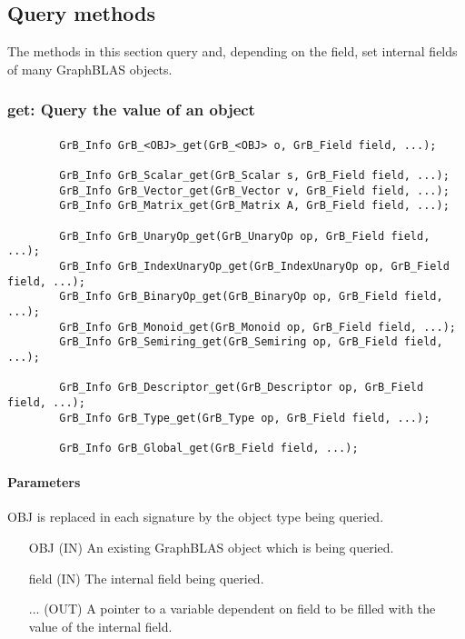 \subsection{Query methods}

The methods in this section query and, depending on the field, 
set internal fields of many GraphBLAS objects.

\subsubsection{{\sf get}: Query the value of an object}

\paragraph{\syntax}

\begin{verbatim}
        GrB_Info GrB_<OBJ>_get(GrB_<OBJ> o, GrB_Field field, ...);

        GrB_Info GrB_Scalar_get(GrB_Scalar s, GrB_Field field, ...);
        GrB_Info GrB_Vector_get(GrB_Vector v, GrB_Field field, ...);
        GrB_Info GrB_Matrix_get(GrB_Matrix A, GrB_Field field, ...);

        GrB_Info GrB_UnaryOp_get(GrB_UnaryOp op, GrB_Field field, ...);
        GrB_Info GrB_IndexUnaryOp_get(GrB_IndexUnaryOp op, GrB_Field field, ...);
        GrB_Info GrB_BinaryOp_get(GrB_BinaryOp op, GrB_Field field, ...);
        GrB_Info GrB_Monoid_get(GrB_Monoid op, GrB_Field field, ...);
        GrB_Info GrB_Semiring_get(GrB_Semiring op, GrB_Field field, ...);

        GrB_Info GrB_Descriptor_get(GrB_Descriptor op, GrB_Field field, ...);
        GrB_Info GrB_Type_get(GrB_Type op, GrB_Field field, ...);

        GrB_Info GrB_Global_get(GrB_Field field, ...);
\end{verbatim}

\paragraph{Parameters}

{\sf OBJ} is replaced in each signature by the object type being queried.

\begin{itemize}[leftmargin=1.1in]
    \item[{\sf OBJ}] ({\sf IN}) An existing GraphBLAS object which is being queried.
    \item[{\sf field}] ({\sf IN}) The internal field being queried.
    \item[{\sf ...}] ({\sf OUT}) A pointer to a variable dependent on {\sf field} to be
                                 filled with the value of the internal field.
\end{itemize}

